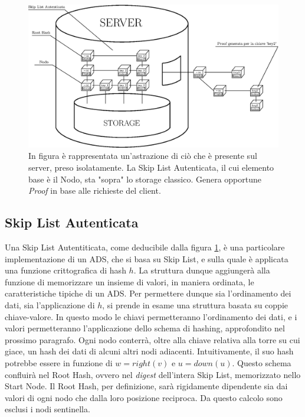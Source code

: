 	\begin{figure}
		\centering
		\includegraphics[scale=0.75]{figure/global.eps}
		\caption{In figura è rappresentata un'astrazione di ciò che è presente sul server, preso isolatamente. La Skip List Autenticata, il cui elemento base è il Nodo, sta "sopra" lo storage classico. Genera opportune \textit{Proof} in base alle richieste del client.}\label{fig:8}
	\end{figure}
	
	\subsection{Skip List Autenticata}
	
%		

	Una Skip List Autentiticata, come deducibile dalla figura \ref{fig:8}, è una particolare implementazione di un ADS, che si basa su Skip List, e sulla quale è applicata una funzione crittografica di hash $ h $. La struttura dunque aggiungerà alla funzione di memorizzare un insieme di valori, in maniera ordinata, le caratteristiche tipiche di un ADS. Per permettere dunque sia l'ordinamento dei dati, sia l'applicazione di $ h $, si prende in esame una struttura  basata su coppie chiave-valore. In questo modo le chiavi permetteranno l'ordinamento dei dati, e i valori permetteranno l'applicazione dello schema di hashing, approfondito nel prossimo paragrafo. Ogni nodo conterrà, oltre alla chiave relativa alla torre su cui giace, un hash dei dati di alcuni altri nodi adiacenti. Intuitivamente, il suo hash potrebbe essere in funzione di $ w = right(v) $ e $ u = down(u) $. Questo schema confluirà nel Root Hash, ovvero nel \textit{digest} dell'intera Skip List, memorizzato nello Start Node.
	Il Root Hash, per definizione, sarà rigidamente dipendente sia dai valori di ogni nodo che dalla loro posizione reciproca. Da questo calcolo sono esclusi i nodi sentinella.
	
